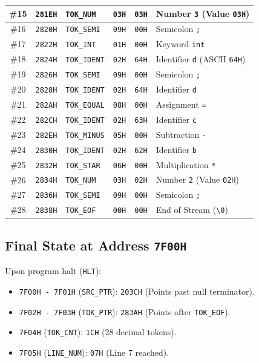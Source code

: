 \documentclass[11pt,a4paper]{article}
\begin{document}
\begin{table}[H]
\begin{tabularx}{\textwidth}{|c|c|l|c|c|X|}
\hline
\#15 & \texttt{281EH} & \texttt{TOK\_NUM}   & \texttt{03H} & \texttt{03H} & Number \texttt{3} (Value \texttt{03H}) \\
\hline
\#16 & \texttt{2820H} & \texttt{TOK\_SEMI}  & \texttt{09H} & \texttt{00H} & Semicolon \texttt{;} \\
\hline
\#17 & \texttt{2822H} & \texttt{TOK\_INT}   & \texttt{01H} & \texttt{00H} & Keyword \texttt{int} \\
\hline
\#18 & \texttt{2824H} & \texttt{TOK\_IDENT} & \texttt{02H} & \texttt{64H} & Identifier \texttt{d} (ASCII \texttt{64H}) \\
\hline
\#19 & \texttt{2826H} & \texttt{TOK\_SEMI}  & \texttt{09H} & \texttt{00H} & Semicolon \texttt{;} \\
\hline
\#20 & \texttt{2828H} & \texttt{TOK\_IDENT} & \texttt{02H} & \texttt{64H} & Identifier \texttt{d} \\
\hline
\#21 & \texttt{282AH} & \texttt{TOK\_EQUAL} & \texttt{08H} & \texttt{00H} & Assignment \texttt{=} \\
\hline
\#22 & \texttt{282CH} & \texttt{TOK\_IDENT} & \texttt{02H} & \texttt{63H} & Identifier \texttt{c} \\
\hline
\#23 & \texttt{282EH} & \texttt{TOK\_MINUS} & \texttt{05H} & \texttt{00H} & Subtraction \texttt{-} \\
\hline
\#24 & \texttt{2830H} & \texttt{TOK\_IDENT} & \texttt{02H} & \texttt{62H} & Identifier \texttt{b} \\
\hline
\#25 & \texttt{2832H} & \texttt{TOK\_STAR}  & \texttt{06H} & \texttt{00H} & Multiplication \texttt{*} \\
\hline
\#26 & \texttt{2834H} & \texttt{TOK\_NUM}   & \texttt{03H} & \texttt{02H} & Number \texttt{2} (Value \texttt{02H}) \\
\hline
\#27 & \texttt{2836H} & \texttt{TOK\_SEMI}  & \texttt{09H} & \texttt{00H} & Semicolon \texttt{;} \\
\hline
\#28 & \texttt{2838H} & \texttt{TOK\_EOF}   & \texttt{00H} & \texttt{00H} & End of Stream (\texttt{\textbackslash 0}) \\
\hline
\end{tabularx}
\end{table}

\subsection*{Final State at Address \texttt{7F00H}}
Upon program halt (\texttt{HLT}):
\begin{itemize}[itemsep=2pt, topsep=2pt]
    \item \texttt{7F00H - 7F01H} (\texttt{SRC\_PTR}): \texttt{203CH} (Points past null terminator).
    \item \texttt{7F02H - 7F03H} (\texttt{TOK\_PTR}): \texttt{283AH} (Points after \texttt{TOK\_EOF}).
    \item \texttt{7F04H} (\texttt{TOK\_CNT}): \texttt{1CH} (28 decimal tokens).
    \item \texttt{7F05H} (\texttt{LINE\_NUM}): \texttt{07H} (Line 7 reached).
\end{itemize}
\end{document}
